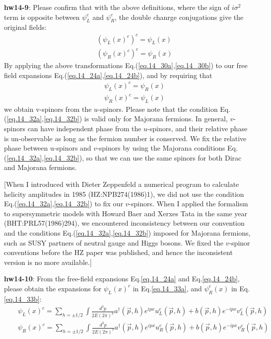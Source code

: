 \documentclass[12pt]{article}
\begin{document}
{\bf hw14-9}: Please confirm that with the above definitions, where the sign
  of $i\sigma^2$ term is opposite between $\psi _L^c$ and $\psi _R^c$, the
  double chanrge conjugations give the original fields:
\begin{eqnarray}
  && (\psi_L(x)^c)^c = \psi_L(x) \label{eq.14_31a}\\
  && (\psi_R(x)^c)^c = \psi_R(x)  \label{eq.14_31b}
\end{eqnarray}
  By applying the above transformations Eq.(\ref{eq.14_30a},\ref{eq.14_30b}) to our free field expansions
  Eq.(\ref{eq.14_24a},\ref{eq.14_24b}), and by requiring that
\begin{eqnarray}
  && \psi_L(x)^c = \psi_R(x) \label{eq.14_32a}\\
  && \psi_R(x)^c = \psi_L(x) \label{eq.14_32b}
\end{eqnarray}
  we obtain v-spinors from the $u$-spinors. Please note that the condition
  Eq.(\ref{eq.14_32a},\ref{eq.14_32b}) is valid only for Majorana fermions. In general, $v$-spinors can
  have independent phase from the $u$-spinors, and their relative phase
  is un-observable as long as the fermion number is conserved. We fix
  the relative phase between u-spinors and $v$-spinors by using the Majorana
  conditions Eq.(\ref{eq.14_32a},\ref{eq.14_32b}), so that we can use the same spinors for both Dirac and Majorana fermions.

  [When I introduced with Dieter Zeppenfeld a numerical program to
  calculate helicity amplitudes in 1985 (HZ:NPB274(1986)1), we did not
  use the condition Eq.(\ref{eq.14_32a},\ref{eq.14_32b})  to fix our $v$-spinors.  When I applied the
  formalism to supersymmetric models with Howard Baer and Xerxes Tata
  in the same year (BHT:PRL57(1986)294), we encountered inconsistency
  between our convention and the conditions Eq.(\ref{eq.14_32a},\ref{eq.14_32b})  imposed for Majorana
  fermions, such as SUSY partners of neutral gauge and Higgs bosons.
  We fixed the $v$-spinor conventions before the HZ paper was published,
  and hence the inconsistent version is no more available.]

{\bf hw14-10}: From the free-field expansions Eq.\ref{eq.14_24a} and Eq.\ref{eq.14_24b}, please obtain
  the expansions for $\psi_L(x)^c$ in Eq.\ref{eq.14_33a}, and $\psi_R^c(x)$ in Eq.\ref{eq.14_33b}:
\begin{eqnarray}
  && \psi_L(x)^c
  = \sum_{h=\pm1/2} \int \frac{d^3p}{2E(2\pi)^3}
  {a^\dagger({\vec p},h) e^{ipx} u_L^c({\vec p},h) +b({\vec p},h) e^{-ipx} v_L^c({\vec p},h)} \label{eq.14_33a} \\
  && \psi_R(x)^c
  = \sum_{h=\pm1/2} \int \frac{d^3p}{2E(2\pi)^3}
  {a^\dagger({\vec p},h) e^{ipx} u_R^c({\vec p},h) +b({\vec p},h) e^{-ipx} v_R^c({\vec p},h)} \label{eq.14_33b} 
\end{eqnarray}
\end{document}
